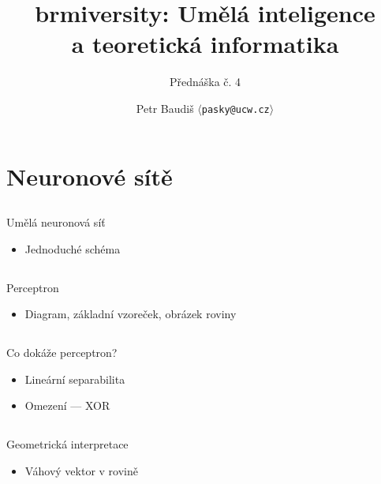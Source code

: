 \documentclass{beamer}
\begin{document}

\title{brmiversity: Umělá inteligence \\ a teoretická informatika}
\subtitle{Přednáška č. 4}
\author{Petr Baudiš $\langle${\tt pasky@ucw.cz}$\rangle$}
\date{}
\frame{\titlepage}

\section{Neuronové sítě}

\subsection{}
\begin{frame}{Umělá neuronová síť}
\begin{itemize}
\item Jednoduché schéma
\end{itemize}
\end{frame}

\subsection{}
\begin{frame}{Perceptron}
\begin{itemize}
\item Diagram, základní vzoreček, obrázek roviny
\end{itemize}
\end{frame}

\subsection{}
\begin{frame}{Co dokáže perceptron?}
\begin{itemize}
\item Lineární separabilita
\item Omezení --- XOR
\end{itemize}
\end{frame}

\subsection{}
\begin{frame}{Geometrická interpretace}
\begin{itemize}
\item Váhový vektor v rovině
\end{itemize}
\end{frame}
\end{document}
